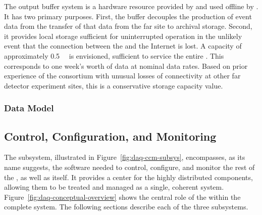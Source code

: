 
The output buffer system is a hardware resource provided by  and used offline by . 
It has two primary purposes. 
First, the buffer decouples the production of event data from the transfer of that data from the far site to archival storage.
Second, it provides local storage sufficient for uninterrupted  operation in the unlikely event that the connection between the  and the Internet is lost. 
A capacity of approximately \SI{0.5}{\peta\byte} is envisioned,
sufficient to service the entire . This corresponds to one
week's worth of data at nominal data rates. Based on prior experience
of the consortium with unusual losses of 
connectivity at other far detector experiment sites, this is a
conservative storage capacity value.

\subsubsection{Data Model}
\label{sec:fd-daq:design-data-model}




\subsection{Control, Configuration, and Monitoring}
\label{sec:fd-daq:design-run-control}


The  subsystem, illustrated in Figure~\ref{fig:daq-ccm-subsys}, encompasses, as its name suggests, the software needed to control, configure, and monitor the rest of the , as well as itself. 
It provides a center for the highly distributed  components, allowing them to be treated and managed as a single, coherent system. 
Figure~\ref{fig:daq-conceptual-overview} shows the central role of the  within the complete  system.
The following sections describe each of the three  subsystems. 

